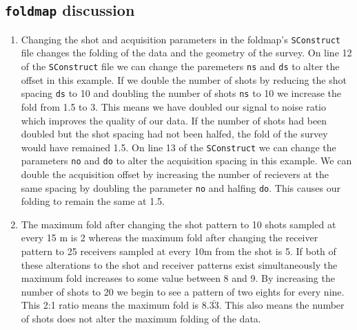 \subsection{\texttt{foldmap} discussion}
\begin{enumerate}


\item Changing the shot and acquisition parameters in the foldmap's \texttt{SConstruct} file changes the folding of the data and the geometry of the survey. On line 12 of the \texttt{SConstruct} file we can change the paremeters \texttt{ns} and \texttt{ds} to alter the offset in this example. If we double the number of shots by reducing the shot spacing \texttt{ds} to 10 and doubling the number of shots \texttt{ns} to 10 we increase the fold from 1.5 to 3. This means we have doubled our signal to noise ratio which improves the quality of our data. If the number of shots had been doubled but the shot spacing had not been halfed, the fold of the survey would have remained 1.5. On line 13 of the \texttt{SConstruct} we can change the parameters \texttt{no} and \texttt{do} to alter the acquisition spacing in this example. We can double the acquisition offset by increasing the number of recievers at the same spacing by doubling the parameter \texttt{no} and halfing \texttt{do}. This causes our folding to remain the same at 1.5.


\item  The maximum fold after changing the shot pattern to 10 shots sampled at every 15 m is 2 whereas the maximum fold after changing the receiver pattern to 25 receivers sampled at every 10m from the shot is 5. If both of these alterations to the shot and receiver patterns exist simultaneously the maximum fold increases to some value between 8 and 9. By increasing the number of shots to 20 we begin to see a pattern of two eights for every nine. This 2:1 ratio means the maximum fold is $8.\bar{33}$. This also means the number of shots does not alter the maximum folding of the data.


\end{enumerate}
